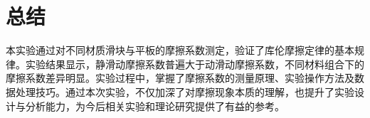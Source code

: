 \section{总结}
本实验通过对不同材质滑块与平板的摩擦系数测定，验证了库伦摩擦定律的基本规律。实验结果显示，静滑动摩擦系数普遍大于动滑动摩擦系数，不同材料组合下的摩擦系数差异明显。实验过程中，掌握了摩擦系数的测量原理、实验操作方法及数据处理技巧。通过本次实验，不仅加深了对摩擦现象本质的理解，也提升了实验设计与分析能力，为今后相关实验和理论研究提供了有益的参考。